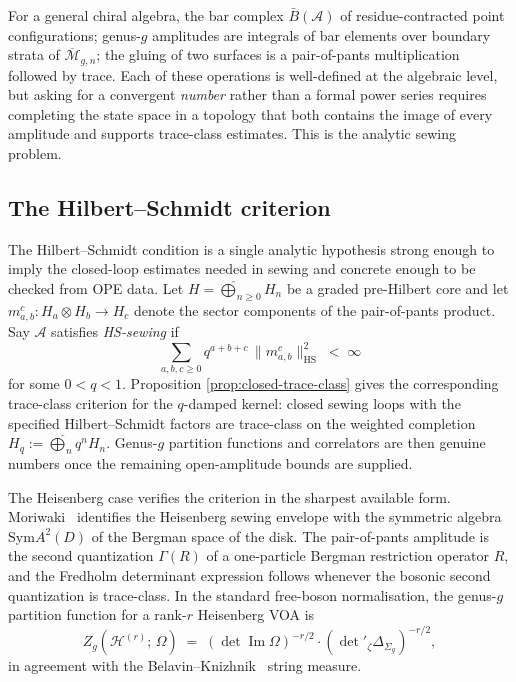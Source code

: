 \documentclass[11pt,reqno]{amsart}
\theoremstyle{definition}
\theoremstyle{remark}
\newcommand{\cA}{\mathcal{A}}
\newcommand{\cH}{\mathcal{H}}
\newcommand{\cM}{\mathcal{M}}
\newcommand{\barB}{\bar{B}}
\newcommand{\Sym}{\mathrm{Sym}}
\newcommand{\HS}{\mathrm{HS}}
\numberwithin{equation}{section}
\begin{document}
For a general chiral algebra, the bar complex
$\barB(\cA)$ of residue-contracted point configurations; genus-$g$
amplitudes are integrals of bar elements over boundary strata of
$\overline{\cM}_{g,n}$; the gluing of two surfaces is a
pair-of-pants multiplication followed by trace. Each of these
operations is well-defined at the algebraic level, but asking
for a convergent \emph{number} rather than a formal power series
requires completing the state space in a topology that both
contains the image of every amplitude and supports trace-class
estimates. This is the analytic sewing problem.

\subsection{The Hilbert--Schmidt criterion}

The Hilbert--Schmidt condition is a single analytic hypothesis
strong enough to imply the closed-loop estimates needed in sewing
and concrete enough to be checked from OPE data. Let
$H = \widehat{\bigoplus}_{n \geq 0}
H_n$ be a graded pre-Hilbert core and let
$m_{a,b}^c \colon H_a \otimes H_b \to H_c$ denote the sector
components of the pair-of-pants product. Say $\cA$ satisfies
\emph{HS-sewing} if
\begin{equation}\label{eq:hs-intro}
\sum_{a,b,c \geq 0} q^{a+b+c}\, \|m_{a,b}^c\|_{\HS}^2
\;<\; \infty
\end{equation}
for some $0 < q < 1$. Proposition
\ref{prop:closed-trace-class} gives the corresponding trace-class
criterion for the \(q\)-damped kernel: closed sewing loops with the
specified Hilbert--Schmidt factors are trace-class on the weighted
completion $H_q := \widehat{\bigoplus}_n q^n H_n$. Genus-$g$
partition functions and correlators are then genuine numbers once
the remaining open-amplitude bounds are supplied.

The Heisenberg case verifies the criterion in the sharpest available
form. Moriwaki~\cite{Moriwaki26b}
identifies the Heisenberg sewing envelope with the symmetric
algebra $\Sym A^2(D)$ of the Bergman space of the disk. The
pair-of-pants amplitude is the second quantization
$\Gamma(R)$ of a one-particle Bergman restriction operator $R$,
and the Fredholm determinant expression follows whenever the bosonic
second quantization is trace-class. In the standard free-boson
normalisation, the genus-$g$ partition function for a rank-$r$
Heisenberg VOA is
\begin{equation}\label{eq:heisenberg-partition-intro}
Z_g(\cH^{(r)};\,\Omega)
\;=\;
(\det\operatorname{Im}\Omega)^{-r/2}
\cdot (\det{}'_\zeta \Delta_{\Sigma_g})^{-r/2},
\end{equation}
in agreement with the Belavin--Knizhnik~\cite{BK86} string measure.
\end{document}
